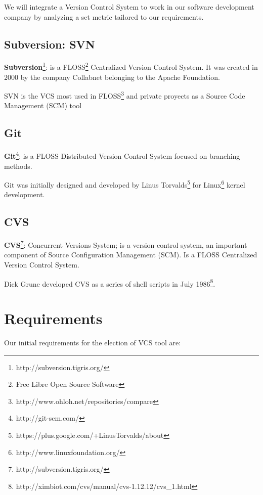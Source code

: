\documentclass[11pt]{scrartcl}
\begin{document}
\par We will integrate a Version Control System to work in our software development company by analyzing a set metric tailored to our requirements.

\subsection{Subversion: SVN}

\textbf{Subversion}\footnote{http://subversion.tigris.org/}: is a FLOSS\footnote{Free Libre Open Source Software}\label{fn:floss} Centralized Version Control System. It was created in 2000 by the company Collabnet belonging to the Apache Foundation.

\par SVN is the VCS most used in FLOSS\footnote{http://www.ohloh.net/repositories/compare} and private proyects as a Source Code Management (SCM) tool

\subsection{Git}

\textbf{Git}\footnote{http://git-scm.com/}: is a FLOSS Distributed Version Control System focused on branching methods.

\par Git was initially designed and developed by Linus Torvalds\footnote{https://plus.google.com/+LinusTorvalds/about} for Linux\footnote{http://www.linuxfoundation.org/} kernel development.

\subsection{CVS}

\textbf{CVS}\footnote{http://subversion.tigris.org/}: Concurrent Versions System; is a version control system, an important component of Source Configuration Management (SCM). Is a FLOSS Centralized Version Control System.

\par Dick Grune developed CVS as a series of shell scripts in July 1986\footnote{http://ximbiot.com/cvs/manual/cvs-1.12.12/cvs\_1.html}.

\section{Requirements}

Our initial requirements for the election of VCS tool are:
\end{document}
